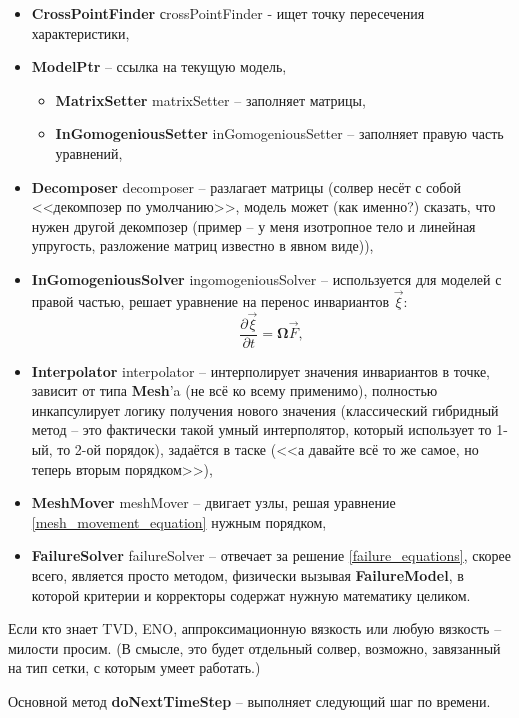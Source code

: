 \documentclass[a4paper,12pt]{article}
\numberwithin{equation}{section}
\begin{document}
	\begin{itemize}
		\item{\textbf{CrossPointFinder} сrossPointFinder - ищет точку пересечения характеристики,}
		\item{\textbf{ModelPtr} -- ссылка на текущую модель,}
		\begin{itemize}
			\item{\textbf{MatrixSetter} matrixSetter -- заполняет матрицы,}
			\item{\textbf{InGomogeniousSetter} inGomogeniousSetter -- заполняет правую часть уравнений,}
		\end{itemize}
		\item{\textbf{Decomposer} decomposer -- разлагает матрицы (солвер несёт с собой <<декомпозер по умолчанию>>, модель может (как именно?) сказать, что нужен другой декомпозер (пример -- у меня изотропное тело и линейная упругость, разложение матриц известно в явном виде)),}
		\item{\textbf{InGomogeniousSolver} ingomogeniousSolver -- используется для моделей с правой частью, решает уравнение на перенос инвариантов $\vec{\xi}$:}
		\begin{equation}
			\label{invariant_equation}
			\frac{\partial\vec{\xi}}{\partial{t}}=\mathbf{\Omega}\vec{F},
		\end{equation}
		\item{\textbf{Interpolator} interpolator -- интерполирует значения инвариантов в точке, зависит от типа \textbf{Mesh}'a (не всё ко всему применимо), полностью инкапсулирует логику получения нового значения (классический гибридный метод -- это фактически такой умный интерполятор, который использует то 1-ый, то 2-ой порядок), задаётся в таске (<<а давайте всё то же самое, но теперь вторым порядком>>),}
		\item{\textbf{MeshMover} meshMover -- двигает узлы, решая уравнение \eqref{mesh_movement_equation} нужным порядком,}
		\item{\textbf{FailureSolver} failureSolver -- отвечает за решение \eqref{failure_equations}, скорее всего, является просто методом, физически вызывая \textbf{FailureModel}, в которой критерии и корректоры содержат нужную математику целиком.}
	\end{itemize}
	
	Если кто знает TVD, ENO, аппроксимационную вязкость или любую вязкость -- милости просим. (В смысле, это будет отдельный солвер, возможно, завязанный на тип сетки, с которым умеет работать.)
	
	Основной метод \textbf{doNextTimeStep} -- выполняет следующий шаг по времени.
\end{document}
